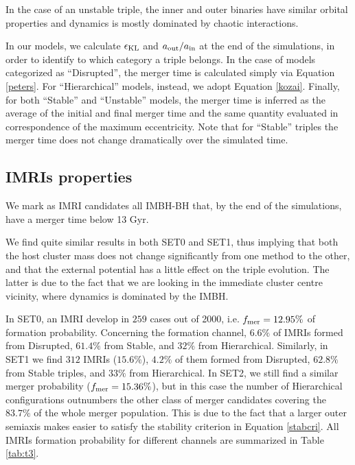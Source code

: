 \documentclass[twocolumn]{aastex62}
\newcommand{\kl}{{\rm KL}}
\newcommand{\inn}{{\rm in}}
\newcommand{\out}{{\rm out}}
\begin{document}
In the case of an unstable triple, the inner and outer binaries have similar orbital properties and dynamics is mostly dominated by chaotic interactions.

In our models, we calculate $\epsilon_\kl$ and $a_\out/a_\inn$ at the end of the simulations, in order to identify to which category a triple belongs. 
In the case of models categorized as ``Disrupted'', the merger time is calculated simply via 
Equation \ref{peters}. For ``Hierarchical'' models, instead, we adopt Equation \ref{kozai}. Finally, for both ``Stable'' and ``Unstable'' models, the merger time is inferred as the average of the initial and final merger time and the same quantity evaluated in correspondence of the maximum eccentricity. Note that for ``Stable'' triples the merger time does not change dramatically over the simulated time.

\subsection{IMRIs properties}

We mark as IMRI candidates all IMBH-BH that, by the end of the simulations, have a merger time below 13 Gyr. 

We find quite similar results in both SET0 and SET1, thus implying that both the host cluster mass does not change significantly from one method to the other, and that the external potential has a little effect on the triple evolution. The latter is due to the fact that we are looking in the immediate cluster centre vicinity, where dynamics is dominated by the IMBH.

In SET0, an IMRI develop in $259$ cases out of 2000, i.e. $f_{\rm mer} = 12.95\%$ of formation probability. Concerning the formation channel, $6.6\%$ of IMRIs formed from Disrupted, $61.4\%$ from Stable, and $32\%$ from Hierarchical. Similarly, in SET1 we find $312$ IMRIs ($15.6\%$), $4.2\%$ of them formed from Disrupted, $62.8\%$ from Stable triples, and $33\%$ from Hierarchical. In SET2, we still find a similar merger probability ($f_{\rm mer} = 15.36\%$), but in this case the number of Hierarchical configurations outnumbers the other class of merger candidates covering the $83.7\%$ of the whole merger population. This is due to the fact that a larger outer semiaxis makes easier to satisfy the stability criterion in Equation \ref{stabcri}.
All IMRIs formation probability for different channels are summarized in Table \ref{tab:t3}. 
\end{document}
